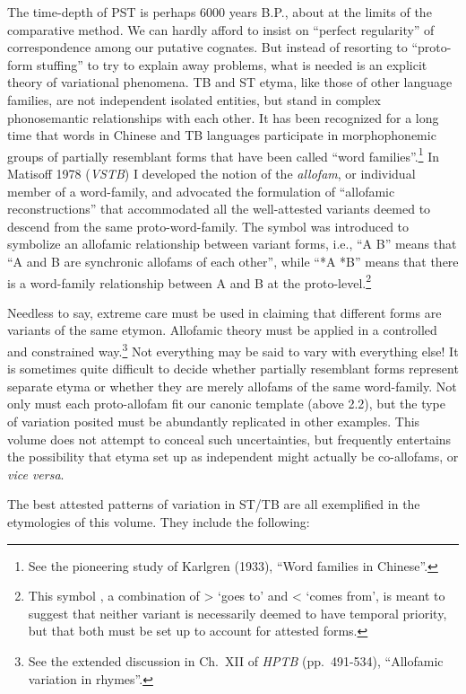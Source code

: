 The time-depth of PST is perhaps 6000 years B.P., about at the limits of the
comparative method. We can hardly afford to insist on “perfect regularity” of
correspondence among our putative cognates.  But instead of resorting to
“proto-form stuffing” to try to explain away problems, what is needed is an
explicit theory of variational phenomena.  TB and ST etyma, like those of other
language families, are not independent isolated entities, but stand in complex
phonosemantic relationships with each other.  It has been recognized for a long
time that words in Chinese and TB languages participate in morphophonemic groups
of partially resemblant forms that have been called “word families”.\footnote{See the pioneering study of Karlgren (1933), “Word families in Chinese”.}  In
Matisoff 1978 (\textit{VSTB}) I developed the notion of the \textit{allofam},
or individual member
of a word-family, and advocated the formulation of “allofamic reconstructions”
that accommodated all the well-attested variants deemed to descend from the same
proto-word-family.  The symbol  was introduced to symbolize an allofamic
relationship between variant forms, i.e., “A  B” means that “A and B are
synchronic allofams of each other”, while “*A  *B” means that there is a
word-family relationship between A and B at the proto-level.\footnote{This
symbol , a combination of  >  ‘goes to’ and < ‘comes from’, is meant to suggest
that neither variant is necessarily deemed to have temporal priority, but that
both must be set up to account for attested forms.}


Needless to say, extreme care must be used in claiming that different forms
are variants of the same etymon.  Allofamic theory must be applied in a
controlled and constrained way.\footnote{See the extended discussion in Ch.~XII
of \textit{HPTB} (pp.~491-534), “Allofamic variation in  rhymes”.} Not everything may be
said to vary with everything else! It is sometimes quite difficult to decide
whether partially resemblant forms represent separate etyma or whether they are
merely allofams of the same word-family.  Not only must each proto-allofam fit
our canonic template (above 2.2), but the type of variation posited must be
abundantly replicated in other examples.  This volume does not attempt to
conceal such uncertainties, but frequently entertains the possibility that etyma
set up as independent might actually be co-allofams, or \textit{vice versa}. 

The best attested patterns of variation in ST/TB are all exemplified in the
etymologies of this volume.  They include the following:

